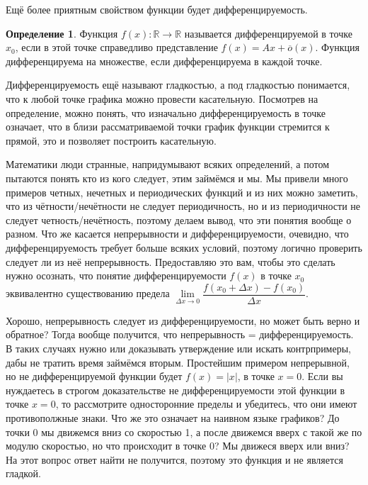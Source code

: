 \documentclass{book} %
\theoremstyle{definition}
\newtheorem{definition}{Определение}[chapter]
\theoremstyle{remark}
\begin{document}
		Ещё более приятным свойством функции будет дифференцируемость.
		\begin{definition}
				Функция $f(x): \mathbb{R} \to \mathbb{R}$ называется дифференцируемой в точке $x_0$, если в этой точке справедливо представление $f(x) = Ax + \overline{o}(x)$. Функция дифференцируема на множестве, если дифференцируема в каждой точке.
		\end{definition}
		Дифференцируемость ещё называют гладкостью, а под гладкостью понимается, что к любой точке графика можно провести касательную. Посмотрев на определение, можно понять, что изначально дифференцируемость в точке означает, что в близи рассматриваемой точки график функции стремится к прямой, это и позволяет построить касательную.
		
		Математики люди странные, напридумывают всяких определений, а потом пытаются понять кто из кого следует, этим займёмся и мы. Мы привели много примеров четных, нечетных и периодических функций и из них можно заметить, что из чётности/нечётности не следует периодичность, но и из периодичности не следует четность/нечётность, поэтому делаем вывод, что эти понятия вообще о разном. Что же касается непрерывности и дифференцируемости, очевидно, что дифференцируемость требует больше всяких условий, поэтому логично проверить следует ли из неё непрерывность. Предоставляю это вам, чтобы это сделать нужно осознать, что понятие дифференцируемости $f(x)$ в точке $x_0$ эквивалентно существованию предела $\lim\limits_{\Delta x \to 0} \dfrac{f(x_0+\Delta x) - f(x_0)}{\Delta x}$.
		
		Хорошо, непрерывность следует из дифференцируемости, но может быть верно и обратное? Тогда вообще получится, что непрерывность = дифференцируемость. В таких случаях нужно или доказывать утверждение или искать контрпримеры, дабы не тратить время займёмся вторым. Простейшим примером непрерывной, но не дифференцируемой функции будет $f(x) = |x|$, в точке $x = 0$. Если вы нуждаетесь в строгом доказательстве не дифференцируемости этой функции в точке $x = 0$, то рассмотрите односторонние пределы и убедитесь, что они имеют противополжные знаки. Что же это означает на наивном языке графиков? До точки 0 мы движемся вниз со скоростью 1, а после движемся вверх с такой же по модулю скоростью, но что происходит в точке 0? Мы движеся вверх или вниз? На этот вопрос ответ найти не получится, поэтому это функция и не является гладкой.
		
\end{document}
